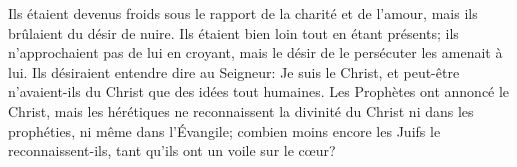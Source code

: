  Ils étaient devenus froids sous le rapport de la charité et de l’amour,
	mais ils brûlaient du désir de nuire.
Ils étaient bien loin tout en étant présents;
	ils n’approchaient pas de lui en croyant,
	mais le désir de le persécuter les amenait à lui.
Ils désiraient entendre dire au Seigneur: Je suis le Christ,
	et peut-être n’avaient-ils du Christ que des idées tout humaines.
Les Prophètes ont annoncé le Christ,
	mais les hérétiques ne reconnaissent la divinité du Christ
	ni dans les prophéties, ni même dans l’Évangile;
	combien moins encore les Juifs le reconnaissent-ils,
	tant qu’ils ont un voile sur le cœur?
